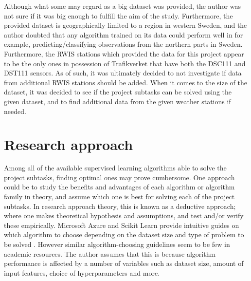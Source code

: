 	 Although what some may regard as a big dataset was provided, the author was not sure if it was big enough to fulfill the aim of the study. Furthermore, the provided dataset is geographically limited to a region in western Sweden, and the author doubted that any algorithm trained on its data could perform well in for example, predicting/classifying observations from the northern parts in Sweden. Furthermore, the RWIS stations which provided the data for this project appear to be the only ones in possession of Trafikverket that have both the DSC111 and DST111 sensors. As of such, it was ultimately decided to not investigate if data from additional RWIS stations should be added. When it comes to the size of the dataset, it was decided to see if the project subtasks can be solved using the given dataset, and to find additional data from the given weather stations if needed.



\section{Research approach}
		Among all of the available supervised learning algorithms able to solve the project subtasks, finding optimal ones may prove cumbersome. One approach could be to study the benefits and advantages of each algorithm or algorithm family in theory, and assume which one is best for solving each of the project subtasks. In research approach theory, this is known as a deductive approach; where one makes theoretical hypothesis and assumptions, and test and/or verify these empirically. Microsoft Azure and Scikit Learn provide intuitive guides on which algorithm to choose depending on the dataset size and type of problem to be solved \cite{WEBSITE:20, WEBSITE:21}. However similar algorithm-choosing guidelines seem to be few in academic resources. The author assumes that this is because algorithm performance is affected by a number of variables such as dataset size, amount of input features, choice of hyperparameters and more. 

